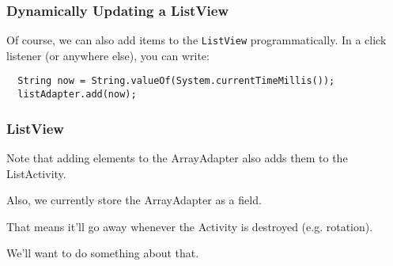 \begin{frame}[fragile]
\frametitle{Dynamically Updating a ListView}
\begin{changemargin}{1cm}
{\scriptsize
Of course, we can also
add items to the {\tt ListView} programmatically. In a click listener (or
anywhere else), you can write:
\begin{verbatim}
  String now = String.valueOf(System.currentTimeMillis());
  listAdapter.add(now);
\end{verbatim}

}
\end{changemargin}
\end{frame}


\begin{frame}
\frametitle{ListView}
\begin{changemargin}{1cm}

Note that adding elements to the ArrayAdapter also adds them to the ListActivity.

Also, we currently store the ArrayAdapter as a field.


That means it'll go away whenever the Activity is destroyed (e.g.
rotation). 

We'll want to do something about that.

\end{changemargin}
\end{frame}


